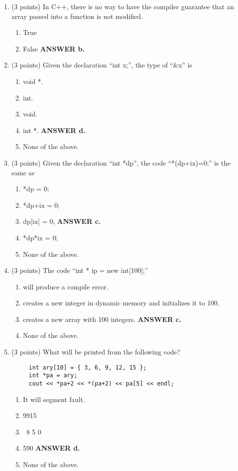\documentclass{article}
\newcommand{\ans}[1]{ \ifnum\showans=1 {\bf ANSWER #1.} \fi }
\begin{document}
\begin{enumerate}
\item (3 points) In C++, there is no way to have the compiler
guarantee that an array passed into a function is not modified.
  \begin{enumerate}
  \item True
  \item False  \ans{b}
  \end{enumerate}

\newpage
\item (3 points) Given the declaration ``int x;'', the type
of ``\&x'' is
  \begin{enumerate}
  \item void *.
  \item int.
  \item void.
  \item int *.  \ans{d}
  \item None of the above.
  \end{enumerate}

\item (3 points) Given the declaration ``int *dp'', the code
``*(dp+ix)=0;'' is the same as
  \begin{enumerate}
  \item *dp = 0;
  \item *dp+ix = 0;
  \item dp[ix] = 0;  \ans{c}
  \item *dp*ix = 0;
  \item None of the above.
  \end{enumerate}

\item (3 points) The code ``int * ip = new int[100];''
  \begin{enumerate}
  \item will produce a compile error.
  \item creates a new integer in dynamic memory and initializes it to 100.
  \item creates a new array with 100 integers. \ans{c}
  \item None of the above.
  \end{enumerate}

\item (3 points) What will be printed from the following code?
\begin{verbatim}
     int ary[10] = { 3, 6, 9, 12, 15 };
     int *pa = ary;
     cout << *pa+2 << *(pa+2) << pa[5] << endl;
\end{verbatim}
  \begin{enumerate}
  \item It will segment fault.
  \item 9915
  \item \ 8 5 0 
  \item 590  \ans{d}
  \item None of the above.
  \end{enumerate}


\end{enumerate}
\end{document}

